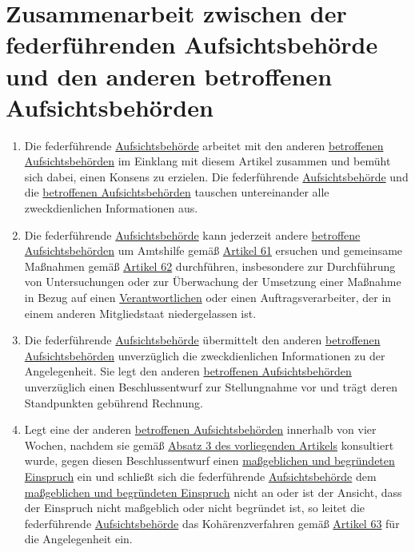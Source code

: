 \chapter{Zusammenarbeit zwischen der federführenden Aufsichtsbehörde und den anderen betroffenen Aufsichtsbehörden}
\label{ch:60}


\begin{enumerate}

  \item Die federführende \hyperref[itm:04-21]{Aufsichtsbehörde} arbeitet mit den anderen \hyperref[itm:04-22]{betroffenen Aufsichtsbehörden} im Einklang mit diesem
   Artikel zusammen und bemüht sich dabei, einen Konsens zu erzielen. Die federführende \hyperref[itm:04-21]{Aufsichtsbehörde} und die
   \hyperref[itm:04-22]{betroffenen Aufsichtsbehörden} tauschen untereinander alle zweckdienlichen Informationen aus.
  \label{itm:60-1}

  \item Die federführende \hyperref[itm:04-21]{Aufsichtsbehörde} kann jederzeit andere \hyperref[itm:04-22]{betroffene Aufsichtsbehörden} um Amtshilfe gemäß
  \hyperref[ch:61]{Artikel 61} ersuchen und gemeinsame Maßnahmen gemäß \hyperref[ch:62]{Artikel 62} durchführen,
   insbesondere zur Durchführung von Untersuchungen oder zur Überwachung der Umsetzung einer Maßnahme in Bezug auf
   einen \hyperref[itm:04-7]{Verantwortlichen} oder einen Auftragsverarbeiter, der in einem anderen Mitgliedstaat niedergelassen ist.
  \label{itm:60-2}

  \item Die federführende \hyperref[itm:04-21]{Aufsichtsbehörde} übermittelt den anderen \hyperref[itm:04-22]{betroffenen Aufsichtsbehörden} unverzüglich die
   zweckdienlichen Informationen zu der Angelegenheit. Sie legt den anderen \hyperref[itm:04-22]{betroffenen Aufsichtsbehörden} unverzüglich
   einen Beschlussentwurf zur Stellungnahme vor und trägt deren Standpunkten gebührend Rechnung.
  \label{itm:60-3}

  \item Legt eine der anderen \hyperref[itm:04-22]{betroffenen Aufsichtsbehörden} innerhalb von vier Wochen, nachdem sie gemäß \hyperref
   [itm:60-3]{Absatz 3 des vorliegenden Artikels} konsultiert wurde, gegen diesen Beschlussentwurf einen \hyperref[itm:04-27]{maßgeblichen
   und begründeten Einspruch} ein und schließt sich die federführende \hyperref[itm:04-21]{Aufsichtsbehörde} dem \hyperref[itm:04-27]{maßgeblichen und begründeten
   Einspruch} nicht an oder ist der Ansicht, dass der Einspruch nicht maßgeblich oder nicht begründet ist, so leitet die
   federführende \hyperref[itm:04-21]{Aufsichtsbehörde} das Kohärenzverfahren gemäß \hyperref[ch:63]{Artikel 63} für die Angelegenheit ein.
  \label{itm:60-4}


\end{enumerate}
